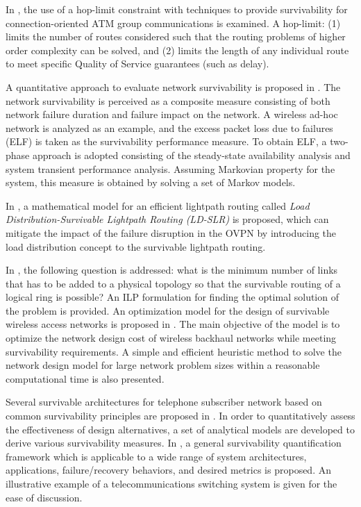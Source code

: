 \documentclass[onecolumn,conference]{IEEEtran}
\begin{document}
    In \cite{b14}, the use of a hop-limit constraint with techniques to provide survivability for connection-oriented ATM group communications is examined. A hop-limit: (1) limits the number of routes considered such that the routing problems of higher order complexity can be solved, and (2) limits the length of any individual route to meet specific Quality of Service guarantees (such as delay).

    A quantitative approach to evaluate network survivability is proposed in \cite{b2}. The network survivability is perceived as a composite measure consisting of both network failure duration and failure impact on the network. A wireless ad-hoc network is analyzed as an example, and the excess packet loss due to failures (ELF) is taken as the survivability performance measure. To obtain ELF, a two-phase approach is adopted consisting of the steady-state availability analysis and system transient performance analysis. Assuming Markovian property for the system, this measure is obtained by solving a set of Markov models.

    In \cite{b11}, a mathematical model for an efficient lightpath routing called \textit{Load Distribution-Survivable Lightpath Routing (LD-SLR)} is proposed, which can mitigate the impact of the failure disruption in the OVPN by introducing the load distribution concept to the survivable lightpath routing.

    In \cite{b12}, the following question is addressed: what is the minimum number of links that has to be added to a physical topology so that the survivable routing of a logical ring is possible? An ILP formulation for finding the optimal solution of the problem is provided. An optimization model for the design of survivable wireless access networks is proposed in \cite{b1}. The main objective of the model is to optimize the network design cost of wireless backhaul networks while meeting survivability requirements. A simple and efficient heuristic method to solve the network design model for large network problem sizes within a reasonable computational time is also presented.

    Several survivable architectures for telephone subscriber network based on common survivability principles are proposed in \cite{b6}. In order to quantitatively assess the effectiveness of design alternatives, a set of analytical models are developed to derive various survivability measures. In \cite{b7}, a general survivability quantification framework which is applicable to a wide range of system architectures, applications, failure/recovery behaviors, and desired metrics is proposed. An illustrative example of a telecommunications switching system is given for the ease of discussion.
\end{document}

